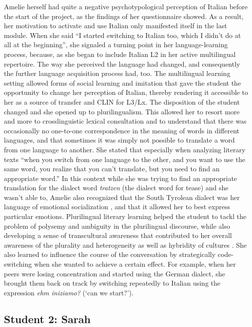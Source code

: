 \documentclass[output=paper]{../langscibook}
\begin{document}
Amelie herself had quite a negative psychotypological perception of Italian before the start of the project, as the findings of her questionnaire showed. As a result, her motivation to activate and use Italian only manifested itself in the last module. When she said “I started switching to Italian too, which I didn’t do at all at the beginning”, she signaled a turning point in her language-learning process, because, as she began to include Italian L2 in her active multilingual repertoire. The way she perceived the language had changed, and consequently the further language acquisition process had, too. The multilingual learning setting allowed forms of social learning and imitation that gave the student the opportunity to change her perception of Italian, thereby rendering it accessible to her as a source of transfer and CLIN for L3/Lx. The disposition of the student changed and she opened up to plurilingualism. This allowed her to resort more and more to crosslinguistic lexical consultation and to understand that there was occasionally no one-to-one correspondence in the meaning of words in different languages, and that sometimes it was simply not possible to translate a word from one language to another. She stated that especially when analyzing literary texts “when you switch from one language to the other, and you want to use the same word, you realize that you can’t translate, but you need to find an appropriate word.” In this context while she was trying to find an appropriate translation for the dialect word \emph{tratzen} (the dialect word for tease) and she wasn’t able to, Amelie also recognized that the South Tyrolean dialect was her language of emotional socialization \citep{Pavlenko2011}, and that it allowed her to best express particular emotions. Plurilingual literary learning helped the student to tackl the problem of polysemy and ambiguity in the plurilingual discourse, while also developing a sense of transcultural awareness that contributed to her overall awareness of the plurality and heterogeneity as well as hybridity of cultures \citep[201]{Hufeisen2010}. She also learned to influence the course of the conversation by strategically code-switching when she wanted to achieve a certain effect. For example, when her peers were losing concentration and started using the German dialect, she brought them back on track by switching repeatedly to Italian using the expression \emph{ehm iniziamo?} (`can we start?').

\subsection{Student 2: Sarah}
\end{document}
